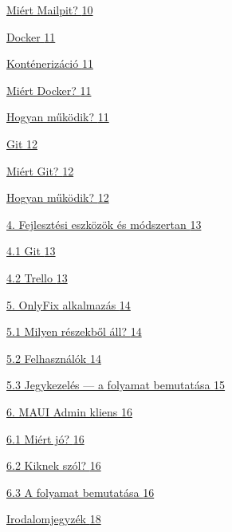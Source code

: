 \hyperref[miuxe9rt-mailpit]{Miért Mailpit? \hyperref[miuxe9rt-mailpit]{10}}

\hyperref[docker]{Docker \hyperref[docker]{11}}

\hyperref[kontuxe9nerizuxe1ciuxf3]{Konténerizáció \hyperref[kontuxe9nerizuxe1ciuxf3]{11}}

\hyperref[miuxe9rt-docker]{Miért Docker? \hyperref[miuxe9rt-docker]{11}}

\hyperref[hogyan-mux171kuxf6dik-5]{Hogyan működik? \hyperref[hogyan-mux171kuxf6dik-5]{11}}

\hyperref[git]{Git \hyperref[git]{12}}

\hyperref[miuxe9rt-git]{Miért Git? \hyperref[miuxe9rt-git]{12}}

\hyperref[hogyan-mux171kuxf6dik-6]{Hogyan működik? \hyperref[hogyan-mux171kuxf6dik-6]{12}}

\hyperref[_Toc223012185]{4. Fejlesztési eszközök és módszertan \hyperref[_Toc223012185]{13}}

\hyperref[git-1]{4.1 Git \hyperref[git-1]{13}}

\hyperref[trello]{4.2 Trello \hyperref[trello]{13}}

\hyperref[_Toc223012186]{5. OnlyFix alkalmazás \hyperref[_Toc223012186]{14}}

\hyperref[milyen-ruxe9szekbux151l-uxe1ll]{5.1 Milyen részekből áll? \hyperref[milyen-ruxe9szekbux151l-uxe1ll]{14}}

\hyperref[felhasznuxe1luxf3k]{5.2 Felhasználók \hyperref[felhasznuxe1luxf3k]{14}}

\hyperref[jegykezeluxe9s-a-folyamat-bemutatuxe1sa]{5.3 Jegykezelés --- a folyamat bemutatása \hyperref[jegykezeluxe9s-a-folyamat-bemutatuxe1sa]{15}}

\hyperref[_Toc223012187]{6. MAUI Admin kliens \hyperref[_Toc223012187]{16}}

\hyperref[miuxe9rt-juxf3]{6.1 Miért jó? \hyperref[miuxe9rt-juxf3]{16}}

\hyperref[kiknek-szuxf3l]{6.2 Kiknek szól? \hyperref[kiknek-szuxf3l]{16}}

\hyperref[a-folyamat-bemutatuxe1sa]{6.3 A folyamat bemutatása \hyperref[a-folyamat-bemutatuxe1sa]{16}}

\hyperref[irodalomjegyzuxe9k]{Irodalomjegyzék \hyperref[irodalomjegyzuxe9k]{18}}

\section{}\label{section-1}

